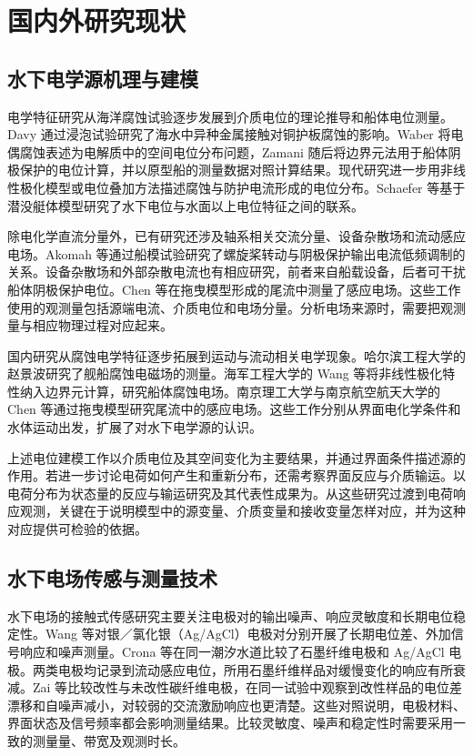 \section{国内外研究现状}
\subsection{水下电学源机理与建模}

电学特征研究从海洋腐蚀试验逐步发展到介质电位的理论推导和船体电位测量。Davy 通过浸泡试验研究了海水中异种金属接触对铜护板腐蚀的影响\cite{davy1824}。Waber 将电偶腐蚀表述为电解质中的空间电位分布问题\cite{waber1953}，Zamani 随后将边界元法用于船体阴极保护的电位计算，并以原型船的测量数据对照计算结果\cite{zamani1988}。现代研究进一步用非线性极化模型或电位叠加方法描述腐蚀与防护电流形成的电位分布\cite{wang2018corrosion,thiel2020}。Schaefer 等基于潜没艇体模型研究了水下电位与水面以上电位特征之间的联系\cite{schaefer2019}。

除电化学直流分量外，已有研究还涉及轴系相关交流分量、设备杂散场和流动感应电场。Akomah 等通过船模试验研究了螺旋桨转动与阴极保护输出电流低频调制的关系\cite{akomah2002}。设备杂散场和外部杂散电流也有相应研究，前者来自船载设备，后者可干扰船体阴极保护电位\cite{yang2006,wang2017stray}。Chen 等在拖曳模型形成的尾流中测量了感应电场\cite{chen2024wake}。这些工作使用的观测量包括源端电流、介质电位和电场分量。分析电场来源时，需要把观测量与相应物理过程对应起来。

国内研究从腐蚀电学特征逐步拓展到运动与流动相关电学现象。哈尔滨工程大学的赵景波研究了舰船腐蚀电磁场的测量\cite{zhao2006}。海军工程大学的 Wang 等将非线性极化特性纳入边界元计算，研究船体腐蚀电场\cite{wang2018corrosion}。南京理工大学与南京航空航天大学的 Chen 等通过拖曳模型研究尾流中的感应电场\cite{chen2024wake}。这些工作分别从界面电化学条件和水体运动出发，扩展了对水下电学源的认识。

上述电位建模工作以介质电位及其空间变化为主要结果，并通过界面条件描述源的作用。若进一步讨论电荷如何产生和重新分布，还需考察界面反应与介质输运。以电荷分布为状态量的反应与输运研究及其代表性成果为\underline{\hspace{6em}}。从这些研究过渡到电荷响应观测，关键在于说明模型中的源变量、介质变量和接收变量怎样对应，并为这种对应提供可检验的依据。

\subsection{水下电场传感与测量技术}

水下电场的接触式传感研究主要关注电极对的输出噪声、响应灵敏度和长期电位稳定性。Wang 等对银／氯化银（Ag/AgCl）电极对分别开展了长期电位差、外加信号响应和噪声测量\cite{wang2025agcl}。Crona 等在同一潮汐水道比较了石墨纤维电极和 Ag/AgCl 电极。两类电极均记录到流动感应电位，所用石墨纤维样品对缓慢变化的响应有所衰减\cite{crona2001}。Zai 等比较改性与未改性碳纤维电极，在同一试验中观察到改性样品的电位差漂移和自噪声减小，对较弱的交流激励响应也更清楚\cite{zai2020carbon}。这些对照说明，电极材料、界面状态及信号频率都会影响测量结果。比较灵敏度、噪声和稳定性时需要采用一致的测量量、带宽及观测时长。

